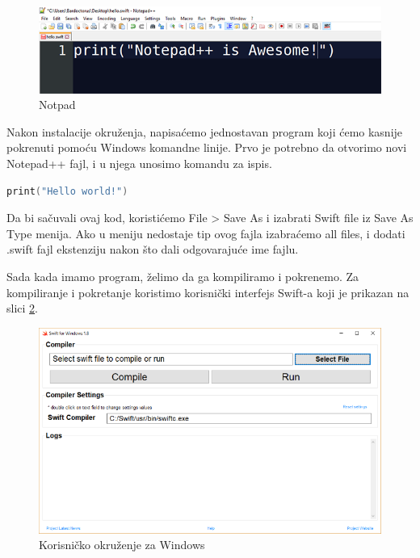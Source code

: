 \documentclass[a4paper]{article}
\begin{document}
\begin{figure}[h!]
\begin{center}
\includegraphics[scale=0.35]{notepadpp.png}
\end{center}
\caption{Notpad}
\label{fig:notpad}
\end{figure}

Nakon instalacije okruženja, napisaćemo jednostavan program koji ćemo kasnije pokrenuti pomoću Windows komandne linije. Prvo je potrebno da otvorimo novi Notepad++ fajl, i u njega unosimo komandu za ispis.

\begin{lstlisting}[language=Swift]
print("Hello world!")
\end{lstlisting}

Da bi sačuvali ovaj kod, koristićemo File > Save As i izabrati Swift file iz Save As Type menija. Ako u meniju nedostaje tip ovog fajla izabraćemo all files, i dodati .swift fajl ekstenziju nakon što dali odgovarajuće ime fajlu.

Sada kada imamo program, želimo da ga kompiliramo i pokrenemo. Za kompiliranje i pokretanje koristimo korisnički interfejs Swift-a koji je prikazan na slici \ref{fig:windows}.

\begin{figure}[h!]
\begin{center}
\includegraphics[scale=0.35]{swift-win.png}
\end{center}
\caption{Korisničko okruženje za Windows}
\label{fig:windows}
\end{figure}
\end{document}
